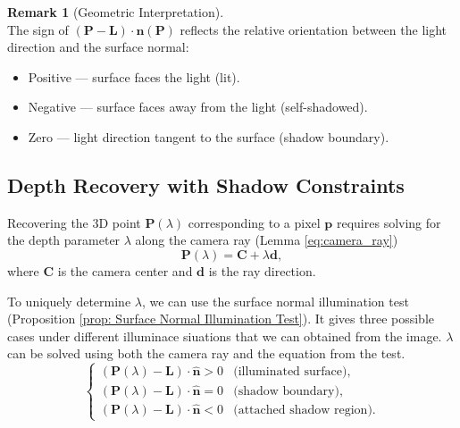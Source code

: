 \documentclass[12pt,a4paper]{article}
\theoremstyle{definition}
\newtheorem{remark}{Remark}[subsection]
\newcommand{\vect}[1]{\bm{#1}}
\begin{document}
\begin{remark}[Geometric Interpretation] \label{rmk:illum_sign} ~\\
The sign of $(\vect{P} - \vect{L}) \cdot \vect{n}(\vect{P})$ reflects the relative orientation between the light direction and the surface normal:
\begin{itemize}[noitemsep, topsep=0pt]
    \item Positive — surface faces the light (lit).
    \item Negative — surface faces away from the light (self-shadowed).
    \item Zero — light direction tangent to the surface (shadow boundary).
\end{itemize}
\end{remark}

\vspace{-1.5em}

\subsection{Depth Recovery with Shadow Constraints}
\vspace{-0.5em}
Recovering the 3D point \(\mathbf{P}(\lambda)\) corresponding to a pixel \(\mathbf{p}\) requires solving for the depth parameter \(\lambda\) along the camera ray (Lemma \ref{eq:camera_ray})
\[
\mathbf{P}(\lambda) = \mathbf{C} + \lambda \mathbf{d},
\]
where \(\mathbf{C}\) is the camera center and \(\mathbf{d}\) is the ray direction.

To uniquely determine \(\lambda\), we can use the surface normal illumination test (Proposition \ref{prop: Surface Normal Illumination Test}). It gives three possible cases under different illuminace siuations that we can obtained from the image. $\lambda$ can be solved using both the camera ray and the equation from the test.
\begin{equation}
\boxed{
\begin{cases}
(\mathbf{P}(\lambda) - \mathbf{L}) \cdot \hat{\mathbf{n}} > 0 & \text{(illuminated surface)}, \\
(\mathbf{P}(\lambda) - \mathbf{L}) \cdot \hat{\mathbf{n}} = 0 & \text{(shadow boundary)}, \\
(\mathbf{P}(\lambda) - \mathbf{L}) \cdot \hat{\mathbf{n}} < 0 & \text{(attached shadow region)}.
\end{cases}
}
\end{equation}
\end{document}
